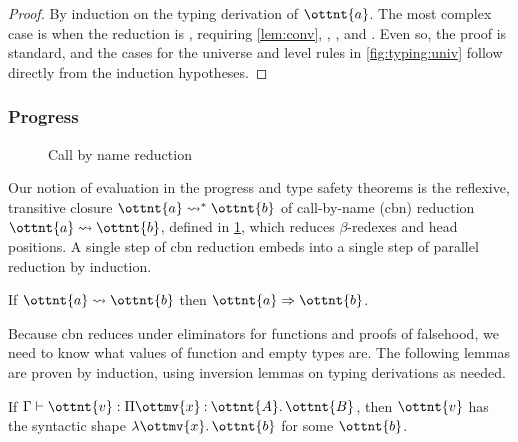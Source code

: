 \documentclass[a4paper,UKenglish,cleveref,autoref,thm-restate]{lipics-v2021}
\begin{document}
\begin{proof}
  By induction on the typing derivation of $\ottnt{a}$.
  The most complex case is when the reduction is ,
  requiring \cref{lem:conv}, ,
  , and .
  Even so, the proof is standard,
  and the cases for the universe and level rules in \cref{fig:typing:univ}
  follow directly from the induction hypotheses.
\end{proof}

\subsubsection{Progress}

\begin{figure}
\caption{Call by name reduction}
\label{fig:cbn}
\end{figure}

Our notion of evaluation in the progress and type safety theorems
is the reflexive, transitive closure  $ \ottnt{a}  \rightsquigarrow^\ast  \ottnt{b} $
of call-by-name (cbn) reduction $ \ottnt{a}  \rightsquigarrow  \ottnt{b} $,
defined in \cref{fig:cbn},
which reduces $\beta$-redexes and head positions.
A single step of cbn reduction embeds into
a single step of parallel reduction by induction.

\begin{lemma}
  If $ \ottnt{a}  \rightsquigarrow  \ottnt{b} $ then $ \ottnt{a}  \Rightarrow  \ottnt{b} $.
\end{lemma}

Because cbn reduces under eliminators for functions and proofs of falsehood,
we need to know what values of function and empty types are.
The following lemmas are proven by induction,
using inversion lemmas on typing derivations as needed.

\begin{lemma} \label{lem:canon:fun}
  If $ \Gamma  \vdash  \ottnt{v}  \mathrel{:}   \Pi  \ottmv{x}  \mathbin{:}  \ottnt{A}  \mathpunct{.}  \ottnt{B}  $,
  then $\ottnt{v}$ has the syntactic shape $ \lambda  \ottmv{x}  \mathpunct{.}  \ottnt{b} $ for some $\ottnt{b}$.
\end{lemma}
\end{document}
